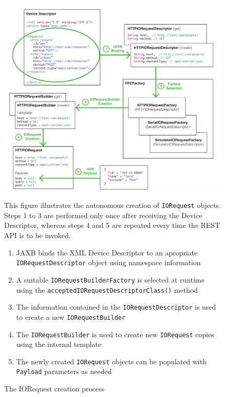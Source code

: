 \begin{figure}[!hbt]
\includegraphics[width=\textwidth]{imgs/iorequest_creation_process.pdf}
\caption{The IORequest creation process}
\label{fig:iorequest.creation}
{
\begin{figurenote}
This figure illustrates the autonomous creation of \texttt{IORequest} objects. Steps 1 to 3 are performed only once after receiving the Device Descriptor, whereas steps 4 and 5 are repeated every time the REST API is to be invoked.
\begin{enumerate}
  \itemsep0em
  \item JAXB binds the XML Device Descriptor to an apropriate \texttt{IORequestDescriptor} object using namespace information
  \item A suitable \texttt{IORequestBuilderFactory} is selected at runtime using the \texttt{acceptedIORequestDescriptorClass()} method
  \item The information contained in the \texttt{IORequestDescriptor} is used to create a new \texttt{IORequestBuilder}
  \item The \texttt{IORequestBuilder} is used to create new \texttt{IORequest} copies using the internal template
  \item The newly created \texttt{IORequest} objects can be populated with \texttt{Payload} parameters as needed
\end{enumerate}
\vspace{-1em}
\end{figurenote}
}
\end{figure}

